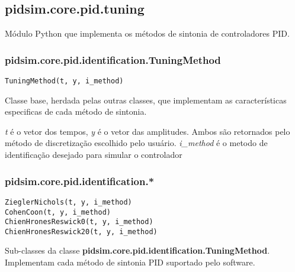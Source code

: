 \subsection{pidsim.core.pid.tuning}
    
    Módulo Python que implementa os métodos de sintonia de controladores
    \acs{PID}.
    
    \subsubsection{pidsim.core.pid.identification.TuningMethod}
        
        \begin{verbatim}
TuningMethod(t, y, i_method)\end{verbatim}
        
        Classe base, herdada pelas outras classes, que implementam as
        características especificas de cada método de sintonia.
        
        \textit{t} é o vetor dos tempos, \textit{y} é o vetor das amplitudes.
        Ambos são retornados pelo método de discretização escolhido pelo
        usuário. \textit{i\_method} é o metodo de identificação desejado
        para simular o controlador
    
    \subsubsection{pidsim.core.pid.identification.*}
        
        \begin{verbatim}
ZieglerNichols(t, y, i_method)
CohenCoon(t, y, i_method)
ChienHronesReswick0(t, y, i_method)
ChienHronesReswick20(t, y, i_method)\end{verbatim}
        
        Sub-classes da classe \textbf{pidsim.core.pid.identification.TuningMethod}.
        Implementam cada método de sintonia \acs{PID} suportado pelo software.
